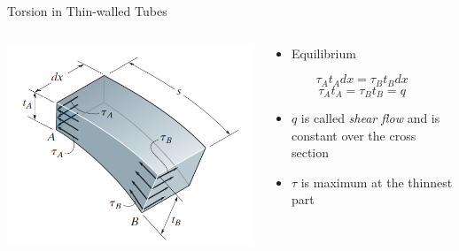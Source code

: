 \documentclass[10pt, svgnames]{beamer}
\begin{document}
\begin{frame}[label={sec:org8881c80}]{Torsion in Thin-walled Tubes}
\begin{columns}
\begin{column}{0.5\columnwidth}
\begin{center}
\begin{center}
\includegraphics[width=.9\linewidth]{./pictures/thin-walled-tube.png}
\end{center}
\end{center}
\end{column}

\begin{column}{0.5\columnwidth}
\begin{itemize}
\item Equilibrium
\end{itemize}

\[\tau_A t_A dx = \tau_B t_B dx\] \[\tau_A t_A = \tau_B t_B = q\]

\begin{itemize}
\item \(q\) is called \emph{shear flow} and is constant over the cross section

\item \(\tau\) is maximum at the thinnest part
\end{itemize}
\end{column}
\end{columns}
\end{frame}
\end{document}
